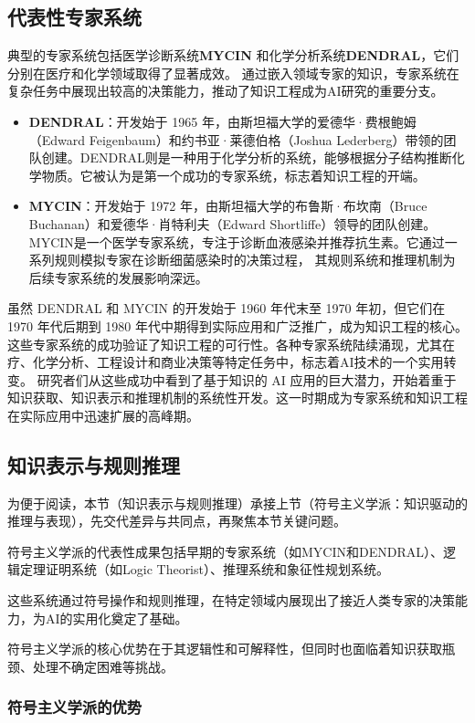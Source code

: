\subsection{代表性专家系统}

典型的专家系统包括医学诊断系统{\bf MYCIN} 和化学分析系统{\bf DENDRAL}，它们分别在医疗和化学领域取得了显著成效。
通过嵌入领域专家的知识，专家系统在复杂任务中展现出较高的决策能力，推动了知识工程成为AI研究的重要分支。
\begin{itemize}
\item {\bf DENDRAL}：开发始于 1965 年，由斯坦福大学的爱德华·费根鲍姆（Edward Feigenbaum）和约书亚·莱德伯格（Joshua Lederberg）带领的团队创建。DENDRAL则是一种用于化学分析的系统，能够根据分子结构推断化学物质。它被认为是第一个成功的专家系统，标志着知识工程的开端。
\item {\bf MYCIN}：开发始于 1972 年，由斯坦福大学的布鲁斯·布坎南（Bruce Buchanan）和爱德华·肖特利夫（Edward Shortliffe）领导的团队创建。MYCIN是一个医学专家系统，专注于诊断血液感染并推荐抗生素。它通过一系列规则模拟专家在诊断细菌感染时的决策过程， 其规则系统和推理机制为后续专家系统的发展影响深远。
\end{itemize}
虽然 DENDRAL 和 MYCIN 的开发始于 1960 年代末至 1970 年初，但它们在 1970 年代后期到 1980 年代中期得到实际应用和广泛推广，成为知识工程的核心。
这些专家系统的成功验证了知识工程的可行性。各种专家系统陆续涌现，尤其在疗、化学分析、工程设计和商业决策等特定任务中，标志着AI技术的一个实用转变。
研究者们从这些成功中看到了基于知识的 AI 应用的巨大潜力，开始着重于知识获取、知识表示和推理机制的系统性开发。这一时期成为专家系统和知识工程在实际应用中迅速扩展的高峰期。


\subsection{知识表示与规则推理}

为便于阅读，本节（知识表示与规则推理）承接上节（符号主义学派：知识驱动的推理与表现），先交代差异与共同点，再聚焦本节关键问题。

符号主义学派的代表性成果包括早期的专家系统（如MYCIN和DENDRAL）、逻辑定理证明系统（如Logic Theorist）、推理系统和象征性规划系统。

这些系统通过符号操作和规则推理，在特定领域内展现出了接近人类专家的决策能力，为AI的实用化奠定了基础。

符号主义学派的核心优势在于其逻辑性和可解释性，但同时也面临着知识获取瓶颈、处理不确定困难等挑战。

\subsubsection*{符号主义学派的优势}

